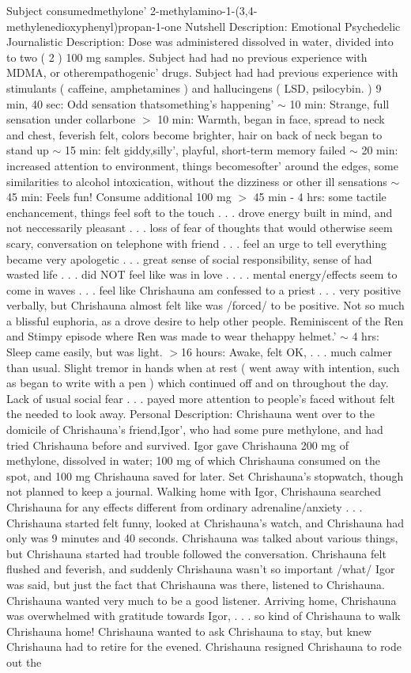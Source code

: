 \documentclass[12pt]{book}
\begin{document}
Subject consumedmethylone' 2-methylamino-1-(3,4-methylenedioxyphenyl)propan-1-one Nutshell Description: Emotional Psychedelic Journalistic Description: Dose was administered dissolved in water, divided into to two ( 2 ) 100 mg samples. Subject had had no previous experience with MDMA, or otherempathogenic' drugs. Subject had had previous experience with stimulants ( caffeine, amphetamines ) and hallucingens ( LSD, psilocybin. ) 9 min, 40 sec: Odd sensation thatsomething's happening' $\sim$ 10 min: Strange, full sensation under collarbone $>$ 10 min: Warmth, began in face, spread to neck and chest, feverish felt, colors become brighter, hair on back of neck began to stand up $\sim$ 15 min: felt giddy,silly', playful, short-term memory failed $\sim$ 20 min: increased attention to environment, things becomesofter' around the edges, some similarities to alcohol intoxication, without the dizziness or other ill sensations $\sim$ 45 min: Feels fun! Consume additional 100 mg $>$ 45 min - 4 hrs: some tactile enchancement, things feel soft to the touch . . .  drove energy built in mind, and not neccessarily pleasant . . .  loss of fear of thoughts that would otherwise seem scary, conversation on telephone with friend . . .  feel an urge to tell everything became very apologetic . . .  great sense of social responsibility, sense of had wasted life . . .  did NOT feel like was in love . . .  . mental energy/effects seem to come in waves . . .  feel like Chrishauna am confessed to a priest . . .  very positive verbally, but Chrishauna almost felt like was /forced/ to be positive. Not so much a blissful euphoria, as a drove desire to help other people. Reminiscent of the Ren and Stimpy episode where Ren was made to wear thehappy helmet.' $\sim$ 4 hrs: Sleep came easily, but was light. $>$16 hours: Awake, felt OK, . . .  much calmer than usual. Slight tremor in hands when at rest ( went away with intention, such as began to write with a pen ) which continued off and on throughout the day. Lack of usual social fear . . .  payed more attention to people's faced without felt the needed to look away. Personal Description: Chrishauna went over to the domicile of Chrishauna's friend,Igor', who had some pure methylone, and had tried Chrishauna before and survived. Igor gave Chrishauna 200 mg of methylone, dissolved in water; 100 mg of which Chrishauna consumed on the spot, and 100 mg Chrishauna saved for later. Set Chrishauna's stopwatch, though not planned to keep a journal. Walking home with Igor, Chrishauna searched Chrishauna for any effects different from ordinary adrenaline/anxiety . . .  Chrishauna started felt funny, looked at Chrishauna's watch, and Chrishauna had only was 9 minutes and 40 seconds. Chrishauna was talked about various things, but Chrishauna started had trouble followed the conversation. Chrishauna felt flushed and feverish, and suddenly Chrishauna wasn't so important /what/ Igor was said, but just the fact that Chrishauna was there, listened to Chrishauna. Chrishauna wanted very much to be a good listener. Arriving home, Chrishauna was overwhelmed with gratitude towards Igor,  . . .  so kind of Chrishauna to walk Chrishauna home! Chrishauna wanted to ask Chrishauna to stay, but knew Chrishauna had to retire for the evened. Chrishauna resigned Chrishauna to rode out the 
\end{document}
